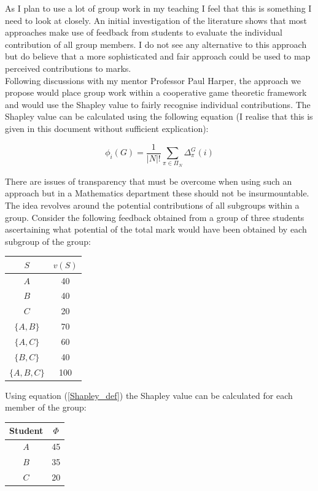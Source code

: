 \documentclass[a4paper,12pt]{article}
\begin{document}
As I plan to use a lot of group work in my teaching I feel that this is something I need to look at closely. An initial investigation of the literature \cite{Lejk1996a,Kember2007a} shows that most approaches make use of feedback from students to evaluate the individual contribution of all group members. I do not see any alternative to this approach but do believe that a more sophisticated and fair approach could be used to map perceived contributions to marks.\\

Following discussions with my mentor Professor Paul Harper, the approach we propose would place group work within a cooperative game theoretic framework and would use the Shapley value to fairly recognise individual contributions. The Shapley value can be calculated using the following equation (I realise that this is given in this document without sufficient explication):

\begin{equation}
    \phi_i(G)=\frac{1}{|N|!}\sum_{\pi\in\Pi_N}\Delta_{\pi}^{G}(i)\label{Shapley_def}
\end{equation}

There are issues of transparency that must be overcome when using such an approach but in a Mathematics department these should not be insurmountable. The idea revolves around the potential contributions of all subgroups within a group. Consider the following feedback obtained from a group of three students ascertaining what potential of the total mark would have been obtained by each subgroup of the group:

\begin{center}
    \begin{tabular}{c|c}
        $S$&$v(S)$\\
        \hline
        $A$&40\\
        $B$&40\\
        $C$&20\\
        $\{A,B\}$&70\\
        $\{A,C\}$&60\\
        $\{B,C\}$&40\\
        $\{A,B,C\}$&100
    \end{tabular}
\end{center}

Using equation (\ref{Shapley_def}) the Shapley value can be calculated for each member of the group:

\begin{center}
    \begin{tabular}{c|c}
        Student&$\Phi$\\\hline
        $A$&45\\
        $B$&35\\
        $C$&20
    \end{tabular}
\end{center}
\end{document}
